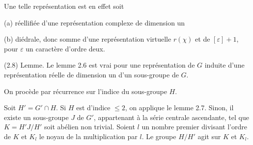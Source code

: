 \documentclass[9pt,twoside]{extarticle}
\begin{document}
{Une telle représentation est en effet soit\par

(a) réellifiée d’une représentation complexe de dimension un\par

(b) diédrale, donc somme d’une représentation virtuelle \(r(\chi)\) et de \([\varepsilon]+1\), pour \(\varepsilon\) un caractère d’ordre deux.\par

(2.8) Lemme. Le lemme 2.6 est vrai pour une représentation de \(G\) induite d’une représentation réelle de dimension un d’un sous-groupe de \(G\).\par

On procède par récurrence sur l’indice du sous-groupe \(H\).\par

Soit \(H'=G'\cap H\). Si \(H\) est d’indice \(\leq2\), on applique le lemme 2.7. Sinon, il existe un sous-groupe \(J\) de \(G'\), appartenant à la série centrale ascendante, tel que \(K=H'J/H'\) soit abélien non trivial. Soient \(l\) un nombre premier divisant l’ordre de \(K\) et \(K_l\) le noyau de la multiplication par \(l\). Le groupe \(H/H'\) agit sur \(K\) et \(K_l\).\par
}
\end{document}
